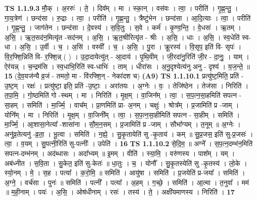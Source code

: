 \documentclass[17pt]{extarticle}
\begin{document}
                  \newline
                                \textbf{ TS 1.1.9.3} \newline
                  मौ॒क् । अ॒ररुः॑ । ते॒ । दिव᳚म् । मा । स्का॒न् । वस॑वः । त्वा॒ । परीति॑ । गृ॒ह्ण॒न्तु॒ । गा॒य॒त्रेण॑ । छन्द॑सा । रु॒द्राः । त्वा॒ । परीति॑ । गृ॒ह्ण॒न्तु॒ । त्रैष्टु॑भेन । छन्द॑सा । आ॒दि॒त्याः । त्वा॒ । परीति॑ । गृ॒ह्ण॒न्तु॒ । जाग॑तेन । छन्द॑सा । दे॒वस्य॑ । स॒वि॒तुः । स॒वे । कर्म॑ । कृ॒ण्व॒न्ति॒ । वे॒धसः॑ । ऋ॒तम् । अ॒सि॒ । ऋ॒त॒सद॑न॒मित्यृ॑त -सद॑नम् । अ॒सि॒ । ऋ॒त॒श्रीरित्यृ॑त - श्रीः । अ॒सि॒ । धाः । अ॒सि॒ । स्व॒धेति॑ स्व- धा । अ॒सि॒ । उ॒र्वी । च॒ । अ॒सि॑ । वस्वी᳚ । च॒ । अ॒सि॒ । पु॒रा । क्रू॒रस्य॑ । वि॒सृप॒ इति॑ वि- सृपः॑ । वि॒र॒फ्शि॒न्निति॑ वि- र॒फ्शि॒न्न् ( ) । उ॒दा॒दायेत्यु॑त् - आ॒दाय॑ । पृ॒थि॒वीम् । जी॒रदा॑नु॒रिति॑ जी॒र - दा॒नुः॒ । याम् । ऐर॑यन्न् । च॒न्द्रम॑सि । स्व॒धाभि॒रिति॑ स्व-धाभिः॑ । ताम् । धीरा॑सः । अ॒नु॒दृश्येत्य॑नु अनु - दृश्य॑ । य॒ज॒न्ते॒ ॥ \textbf{  15 } \newline
                  \newline
                      (दे॒व॒यज॑न्यै व्र॒जं - तमतो॒ मा - वि॑रफ्शि॒न् - नेका॑दश च)  \textbf{(A9)} \newline \newline
                                \textbf{ TS 1.1.10.1} \newline
                  प्रत्यु॑ष्ट॒मिति॒ प्रति॑ - उ॒ष्ट॒म् । रक्षः॑ । प्रत्यु॑ष्टा॒ इति॒ प्रति॑ -उ॒ष्टाः॒ । अरा॑तयः । अ॒ग्नेः । वः॒ । तेजि॑ष्ठेन । तेज॑सा । निरिति॑ । त॒पा॒मि॒ । गो॒ष्ठमिति॑ गो -स्थम् । मा । निरिति॑ । मृ॒क्ष॒म् । वा॒जिन᳚म् । त्वा॒ । स॒प॒त्न॒सा॒हमिति॑ सपत्न - सा॒हम् । समिति॑ । मा॒र्ज्मि॒ । वाच᳚म् । प्रा॒णमिति॑ प्रा- अ॒नम् । चक्षुः॑ । श्रोत्र᳚म् । प्र॒जामिति॑ प्र -जाम् । योनि᳚म् । मा । निरिति॑ । मृ॒क्ष॒म् । वा॒जिनी᳚म् । त्वा॒ । स॒प॒त्न॒सा॒हीमिति॑ सपत्न - सा॒हीम् । समिति॑ । मा॒र्ज्मि॒ । आ॒शासा॒नेत्या᳚ -शासा॑ना । सौ॒म॒न॒सम् । प्र॒जामिति॑ प्र -जाम् । सौभा᳚ग्यम् । त॒नूम् ॥ अ॒ग्नेः । अनु॑व्र॒तेत्यनु॑ -व्र॒ता॒ । भू॒त्वा । समिति॑ । न॒ह्ये॒ । सु॒कृ॒तायेति॑ सु -कृ॒ताय॑ । कम् ॥ सु॒प्र॒जस॒ इति॑ सु-प्र॒जसः॑ । त्वा॒ । व॒यम् । सु॒पत्नी॒रिति॑ सु-पत्नीः᳚ । उपेति॑ । \textbf{  16} \newline
                  \newline
                                \textbf{ TS 1.1.10.2} \newline
                  से॒दि॒म॒ ॥ अग्ने᳚ । स॒प॒त्न॒दम्भ॑न॒मिति॑ सपत्न-दम्भ॑नम् । अद॑ब्धासः । अदा᳚भ्यम् ॥ इ॒मम् । वीति॑ । स्या॒मि॒ । वरु॑णस्य । पाश᳚म् । यम् । अब॑ध्नीत । स॒वि॒ता । सु॒केत॒ इति॑ सु-केतः॑ ॥ धा॒तुः । च॒ । योनौ᳚ । सु॒कृ॒तस्येति॑ सु -कृ॒तस्य॑ । लो॒के । स्यो॒नम् । मे॒ । स॒ह । पत्या᳚ । क॒रो॒मि॒ ॥ समिति॑ । आयु॑षा । समिति॑ । प्र॒जयेति॑ प्र-जया᳚ । समिति॑ । अ॒ग्ने॒ । वर्च॑सा । पुनः॑ ॥ समिति॑ । पत्नी᳚ । पत्या᳚ । अ॒हम् । ग॒च्छे॒ । समिति॑ । आ॒त्मा । त॒नुवा᳚ । मम॑ ॥ म॒ही॒नाम् । पयः॑ । अ॒सि॒ । ओष॑धीनाम् । रसः॑ । तस्य॑ । ते॒ । अक्षी॑यमाणस्य । निरिति॑ । \textbf{  17 } \newline
\end{document}
